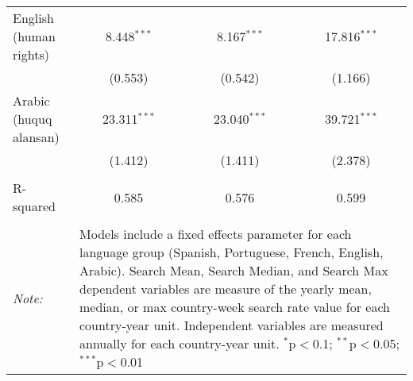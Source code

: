 \begin{table}[!htbp]
\begin{tabular}{@{\extracolsep{5pt}}lccc}
  English (human rights) & 8.448$^{***}$ & 8.167$^{***}$ & 17.816$^{***}$ \\ 
  & (0.553) & (0.542) & (1.166) \\ 
  Arabic (huquq alansan) & 23.311$^{***}$ & 23.040$^{***}$ & 39.721$^{***}$ \\ 
  & (1.412) & (1.411) & (2.378) \\ 
 \hline \\[-1.8ex] 
R-squared  & 0.585 & 0.576 & 0.599 \\ 
\hline 
\hline \\[-1.8ex] 
\textit{Note:}  & \multicolumn{3}{l}{\parbox[t]{8cm}{Models include a fixed effects parameter for each language group (Spanish, Portuguese, French, English, Arabic). Search Mean, Search Median, and Search Max dependent variables are measure of the yearly mean, median, or max country-week search rate value for each country-year unit. Independent variables are measured annually for each country-year unit. $^{*}$p$<$0.1; $^{**}$p$<$0.05; $^{***}$p$<$0.01}} \\ 
\end{tabular} 
\end{table} 
